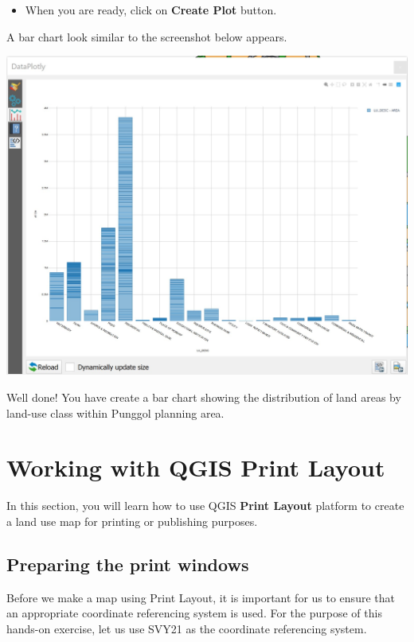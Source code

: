 \documentclass[
  letterpaper,
  DIV=11,
  numbers=noendperiod]{scrreprt}
\providecommand{\tightlist}{%
  \setlength{\itemsep}{0pt}\setlength{\parskip}{0pt}}\usepackage{longtable,booktabs,array}
\begin{document}
\begin{itemize}
\tightlist
\item
  When you are ready, click on \textbf{Create Plot} button.
\end{itemize}

A bar chart look similar to the screenshot below appears.

\includegraphics{./img04/image41.jpg}

Well done! You have create a bar chart showing the distribution of land
areas by land-use class within Punggol planning area.

\hypertarget{working-with-qgis-print-layout}{%
\section{Working with QGIS Print
Layout}\label{working-with-qgis-print-layout}}

In this section, you will learn how to use QGIS \textbf{Print Layout}
platform to create a land use map for printing or publishing purposes.

\hypertarget{preparing-the-print-windows}{%
\subsection{Preparing the print
windows}\label{preparing-the-print-windows}}

Before we make a map using Print Layout, it is important for us to
ensure that an appropriate coordinate referencing system is used. For
the purpose of this hands-on exercise, let us use SVY21 as the
coordinate referencing system.
\end{document}
